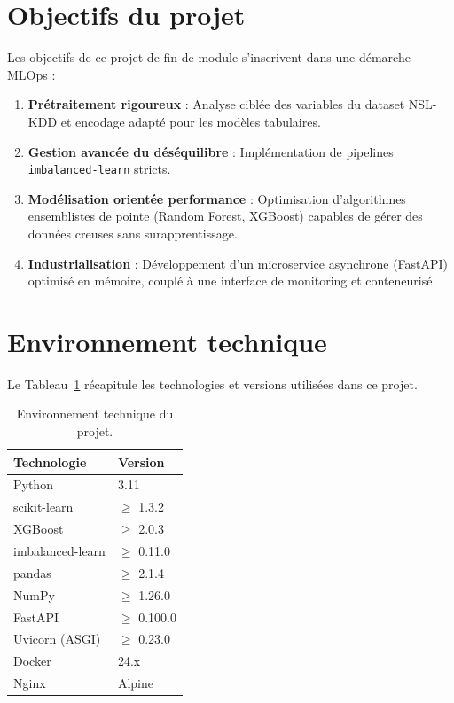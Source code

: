 \documentclass[12pt,a4paper]{report}
\begin{document}
\section{Objectifs du projet}

Les objectifs de ce projet de fin de module s'inscrivent dans une démarche MLOps :
\begin{enumerate}[leftmargin=2cm]
    \item \textbf{Prétraitement rigoureux} : Analyse ciblée des variables du dataset NSL-KDD et encodage adapté pour les modèles tabulaires.
    \item \textbf{Gestion avancée du déséquilibre} : Implémentation de pipelines \texttt{imbalanced-learn} stricts.
    \item \textbf{Modélisation orientée performance} : Optimisation d'algorithmes ensemblistes de pointe (Random Forest, XGBoost) capables de gérer des données creuses sans surapprentissage.
    \item \textbf{Industrialisation} : Développement d'un microservice asynchrone (FastAPI) optimisé en mémoire, couplé à une interface de monitoring et conteneurisé.
\end{enumerate}

\section{Environnement technique}

Le Tableau~\ref{tab:environnement} récapitule les technologies et versions utilisées dans ce projet.

\begin{table}[H]
    \centering
    \begin{tabular}{ll}
        \toprule
        \textbf{Technologie} & \textbf{Version} \\
        \midrule
        Python & 3.11 \\
        scikit-learn & $\geq$ 1.3.2 \\
        XGBoost & $\geq$ 2.0.3 \\
        imbalanced-learn & $\geq$ 0.11.0 \\
        pandas & $\geq$ 2.1.4 \\
        NumPy & $\geq$ 1.26.0 \\
        FastAPI & $\geq$ 0.100.0 \\
        Uvicorn (ASGI) & $\geq$ 0.23.0 \\
        Docker & 24.x \\
        Nginx & Alpine \\
        \bottomrule
    \end{tabular}
    \caption{Environnement technique du projet.}
    \label{tab:environnement}
\end{table}
\end{document}
